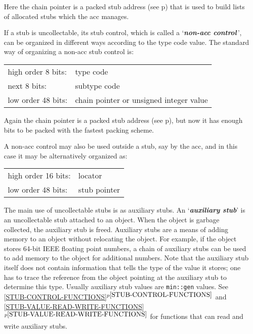 \documentclass[12pt]{article}
\newcommand{\key}[1]{{\bf \em #1}\index{#1}}
\newcommand{\itemref}[1]{\ref{#1}$^{p\pageref{#1}}$}
\newcommand{\pagref}[1]{p\pageref{#1}}
\begin{document}
Here the chain pointer is a packed stub address
(see \pagref{STUB-ADDRESS-PACKING})
that is used to build lists of allocated stubs which
the acc manages.

If a stub is uncollectable, its stub control, which is called
a `\key{non-acc control}\,', can be organized in different
ways according to the type code value.  The standard way of organizing
a non-acc stub control is:

\begin{center}
\begin{tabular}{ll}
high order 8 bits:	& type code \\
next 8 bits:		& subtype code \\
low order 48 bits:	& chain pointer or unsigned integer value \\
\end{tabular}
\end{center}

Again the chain pointer is a packed stub address
(see \pagref{STUB-ADDRESS-PACKING}),
but now it has enough bits to be packed with the fastest packing scheme.

A non-acc control may also be used outside a stub, say by the acc, and
in this case it may be alternatively organized as:

\begin{center}
\begin{tabular}{ll}
high order 16 bits:	& locator \\
low order 48 bits:	& stub pointer \\
\end{tabular}
\end{center}

The main use of uncollectable stubs is as auxiliary stubs.
An `\key{auxiliary stub}' is an uncollectable stub attached to an object.
When the object is garbage collected, the auxiliary stub is freed.  Auxiliary
stubs are a means of adding memory to an object without relocating the object.
For example, if the object stores 64-bit IEEE floating point numbers,
a chain of auxiliary stubs can be used to add memory to the object
for additional numbers.  Note that the auxiliary stub itself does not
contain information that tells the type of the value it stores;
one has to trace the reference from the object pointing at the
auxiliary stub to determine this type.  Usually auxiliary stub
values are \verb|min::gen| values.
See \itemref{STUB-CONTROL-FUNCTIONS} and
\itemref{STUB-VALUE-READ-WRITE-FUNCTIONS}
for functions that can read and write auxiliary stubs.
\end{document}
